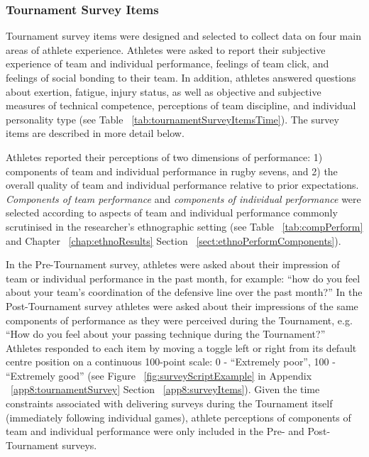 \begin{CJK}{UTF8}{gbsn}


\subsubsection{Tournament Survey Items\label{survey:Tournament Survey Items}}

Tournament survey items were designed and selected to collect data on four main areas of athlete experience.  Athletes were asked to report their subjective experience of team and individual performance, feelings of team click, and feelings of social bonding to their team.  In addition, athletes answered questions about exertion, fatigue, injury status, as well as objective and subjective measures of technical competence, perceptions of team discipline, and individual personality type (see Table ~\ref{tab:tournamentSurveyItemsTime}). The survey items are described in more detail below.



Athletes reported their perceptions of two dimensions of performance: 1) components of team and individual performance in rugby sevens, and 2) the overall quality of team and individual performance relative to prior expectations.  \textit{Components of team performance} and \textit{components of individual performance} were selected according to aspects of team and individual performance commonly scrutinised in the researcher's ethnographic setting (see Table ~\ref{tab:compPerform} and Chapter ~\ref{chap:ethnoResults} Section ~\ref{sect:ethnoPerformComponents}).



In the Pre-Tournament survey, athletes were asked about their impression of team or individual performance in the past month, for example: ``how do you feel about your team's coordination of the defensive line over the past month?''  In the Post-Tournament survey athletes were asked about their impressions of the same components of performance as they were perceived during the Tournament, e.g. ``How do you feel about your passing technique during the Tournament?'' Athletes responded to each item by moving a toggle left or right from its default centre position on a continuous 100-point scale: 0 - ``Extremely poor'', 100 - ``Extremely good'' (see Figure ~\ref{fig:surveyScriptExample} in Appendix ~\ref{app8:tournamentSurvey} Section ~\ref{app8:surveyItems}).  Given the time constraints associated with delivering surveys during the Tournament itself (immediately following individual games), athlete perceptions of components of team and individual performance were only included in the Pre- and Post-Tournament surveys.


\end{CJK}

